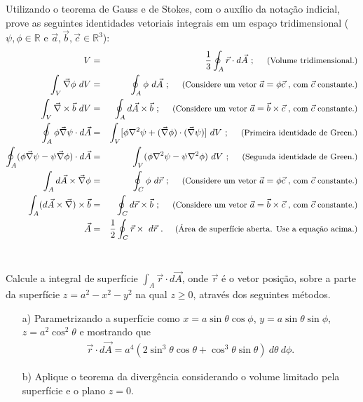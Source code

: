 \documentclass[a4paper,12pt]{article}
\begin{document}
\indent \par Utilizando o teorema de Gauss e de Stokes, com o auxílio da notação indicial, prove as seguintes identidades vetoriais integrais em um espaço tridimensional ($\psi , \phi \in \mathbb{R}$ e $\vec{a} , \vec{b}, \vec{c} \in \mathbb{R}^{3}$):
%
\begin{eqnarray}
\nonumber
V&=&\frac{1}{3}\oint_{A} \vec{r}\cdot d\vec{A} ~; ~~~~{\small{\textnormal{(Volume tridimensional.)}}} \\
\nonumber
\int_{V} \vec{\nabla}\phi ~dV &=& \oint_{A} \phi ~d\vec{A} ~; ~~~~{\small{\textnormal{(Considere um vetor} ~\vec{a}=\phi \vec{c} ~ \textnormal{, com}~ \vec{c} ~\textnormal{constante.)}}}\\
\nonumber
\int_{V} \vec{\nabla} \times \vec{b} ~dV &=& \oint_{A} d\vec{A}\times \vec{b} ~; ~~~~{\small{\textnormal{(Considere um vetor} ~\vec{a}=\vec{b}\times \vec{c} ~ \textnormal{, com}~ \vec{c} ~\textnormal{constante.)}}}\\
\nonumber
\oint_{A} \phi \vec{\nabla}\psi \cdot d\vec{A}&=&\int_{V} [\phi \nabla^{2}\psi + (\vec{\nabla} \phi)\cdot (\vec{\nabla} \psi)] ~dV ~; ~~~~ {\small{ \textnormal{(Primeira identidade de Green.)} }}\\
\nonumber
\oint_{A} (\phi \vec{\nabla}\psi - \psi \vec{\nabla}\phi ) \cdot d\vec{A}&=&\int_{V} (\phi \nabla^{2}\psi - \psi \nabla^{2}\phi) ~dV ~; ~~~~{\small{\textnormal{(Segunda identidade de Green.)}}} \\
\nonumber
\int_{A} d\vec{A}\times \vec{\nabla} \phi &=& \oint_{C} \phi ~d\vec{r} ~; ~~~~{\small{\textnormal{(Considere um vetor} ~\vec{a}=\phi \vec{c} ~ \textnormal{, com}~ \vec{c} ~\textnormal{constante.)}}}\\
\nonumber
\int_{A} (d\vec{A}\times \vec{\nabla}) \times \vec{b}  &=& \oint_{C} d\vec{r}\times \vec{b} ~; ~~~~{\small{\textnormal{(Considere um vetor} ~\vec{a}=\vec{b}\times \vec{c} ~ \textnormal{, com}~ \vec{c} ~\textnormal{constante.)}}}\\
\nonumber
\vec{A} &=& \frac{1}{2} \oint_{C} \vec{r}\times ~d\vec{r} ~. ~~~~{\small{\textnormal{(Área de superfície aberta. Use a equação acima.)}}}
\end{eqnarray}\\


\indent \par Calcule a integral de superfície $\int_{A} \vec{r}\cdot d\vec{A}$, onde $\vec{r}$ é o vetor posição, sobre a parte da superfície $z=a^2 - x^2 - y^2$ na qual $z\geq 0$, através dos seguintes métodos.
%
\begin{itemize}
 \item[a)] Parametrizando a superfície como $x=a\sin \theta \cos \phi$, $y=a\sin \theta \sin \phi$, $z=a^2 \cos^2 \theta$ e       
 mostrando que
 \begin{eqnarray}
\nonumber
\vec{r}\cdot d\vec{A} = a^{4}(2 \sin^3 \theta \cos \theta + \cos^3 \theta \sin \theta) ~d\theta ~d\phi.
\end{eqnarray}
 \item[b)] Aplique o teorema da divergência considerando o volume limitado pela superfície e o plano $z=0$.
\end{itemize}
\end{document}
